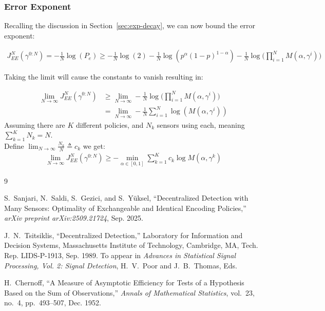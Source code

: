 \documentclass[11pt]{article}
\newcommand{\JNEE}{J^N_{EE}(\gamma^{0:N})}
\begin{document}
\subsubsection*{Error Exponent}
Recalling the discussion in Section~\ref{sec:exp-decay}, we can now bound the error exponent:

\begin{align}
    \JNEE  = -\frac{1}{N}\log(P_e) \geq -\frac{1}{N}\log(2) -\frac{1}{N}\log(p^\alpha (1-p)^{1-\alpha})-\frac{1}{N}\log\bigg( \prod_{i=1}^{N}M(\alpha,\gamma^i) \bigg)
\end{align}

Taking the limit will cause the constants to vanish resulting in:

\begin{align}
    \lim_{N \to \infty}\JNEE &\geq\lim_{N \to \infty} -\frac{1}{N}\log\bigg( \prod_{i=1}^{N}M(\alpha,\gamma^i) \bigg)\\
    &= \lim_{N \to \infty} -\frac{1}{N}\sum_{i=1}^{N} \log(M(\alpha,\gamma^i))
\end{align}
Assuming there are $K$ different policies, and $N_k$ sensors using each, meaning $\sum_{k=1}^{K}N_k = N$.\\
Define $\lim_{N \to \infty}\frac{N_k}{N} \triangleq c_k$ we get:
\begin{align}
    \lim_{N \to \infty}\JNEE \geq -\min_{\alpha \in [0,1]}\sum_{k=1}^{K} c_k \log M(\alpha,\gamma^k)
\end{align}

\begin{thebibliography}{9}

S.~Sanjari, N.~Saldi, S.~Gezici, and S.~Y\"uksel, ``Decentralized Detection with Many Sensors: Optimality of Exchangeable and Identical Encoding Policies,'' \emph{arXiv preprint arXiv:2509.21724}, Sep. 2025.

J.~N.~Tsitsiklis, ``Decentralized Detection,'' Laboratory for Information and Decision Systems, Massachusetts Institute of Technology, Cambridge, MA, Tech. Rep. LIDS-P-1913, Sep. 1989. To appear in \emph{Advances in Statistical Signal Processing, Vol. 2: Signal Detection}, H.~V.~Poor and J.~B.~Thomas, Eds.

H.~Chernoff, ``A Measure of Asymptotic Efficiency for Tests of a Hypothesis Based on the Sum of Observations,'' \emph{Annals of Mathematical Statistics}, vol.~23, no.~4, pp.~493--507, Dec. 1952.

\end{thebibliography}
\end{document}
